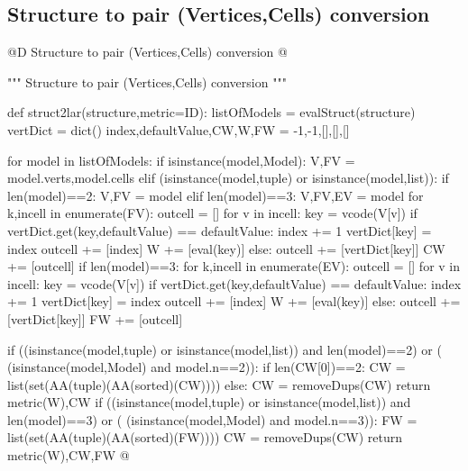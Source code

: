 \documentclass[11pt,oneside]{article}    %
\begin{document}
\subsection{Structure to pair (Vertices,Cells) conversion}
@D Structure to pair (Vertices,Cells) conversion
@{""" Structure to pair (Vertices,Cells) conversion """

def struct2lar(structure,metric=ID):
    listOfModels = evalStruct(structure)
    vertDict = dict()
    index,defaultValue,CW,W,FW = -1,-1,[],[],[]
        
    for model in listOfModels:
        if isinstance(model,Model):
            V,FV = model.verts,model.cells
        elif (isinstance(model,tuple) or isinstance(model,list)):
            if len(model)==2: V,FV = model
            elif len(model)==3: V,FV,EV = model
        for k,incell in enumerate(FV):
            outcell = []
            for v in incell:
                key = vcode(V[v])
                if vertDict.get(key,defaultValue) == defaultValue:
                    index += 1
                    vertDict[key] = index
                    outcell += [index]
                    W += [eval(key)]
                else: 
                    outcell += [vertDict[key]]
            CW += [outcell]
        if len(model)==3:
            for k,incell in enumerate(EV):
                outcell = []
                for v in incell:
                    key = vcode(V[v])
                    if vertDict.get(key,defaultValue) == defaultValue:
                        index += 1
                        vertDict[key] = index
                        outcell += [index]
                        W += [eval(key)]
                    else: 
                        outcell += [vertDict[key]]
                FW += [outcell]
            
    if ((isinstance(model,tuple) or isinstance(model,list)) and len(model)==2) or (
        (isinstance(model,Model) and model.n==2)): 
        if len(CW[0])==2: 
            CW = list(set(AA(tuple)(AA(sorted)(CW))))
        else: CW = removeDups(CW)
        return metric(W),CW
    if ((isinstance(model,tuple) or isinstance(model,list)) and len(model)==3) or (
        (isinstance(model,Model) and model.n==3)): 
        FW = list(set(AA(tuple)(AA(sorted)(FW))))
        CW = removeDups(CW)
        return metric(W),CW,FW
@}
\end{document}
